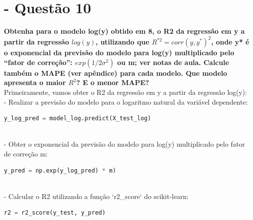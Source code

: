 \documentclass[a4paper, 12pt]{article}
\begin{document}
\section{- Questão 10}
\textbf{Obtenha para o modelo log(y) obtido em 8, o R2 da regressão em y a partir da regressão $log(y)$, utilizando que $R^{*2}= corr(y,y^*)^2$, onde y* é o exponencial da previsão do modelo para log(y) multiplicado pelo “fator de correção”: $exp (1/2\sigma^2)$ ou m; ver notas de aula.
Calcule também o MAPE (ver apêndice) para cada modelo. Que modelo apresenta o maior $R^2$? E o menor MAPE? } \\

Primeiramente, vamos obter o R2 da regressão em y a partir da regressão log(y):\\

- Realizar a previsão do modelo para o logaritmo natural da variável dependente:\\



\begin{tcolorbox}[colback=white,boxrule=1pt,arc=5pt,auto outer arc]
  \begin{lstlisting}[language=Python]
y_log_pred = model_log.predict(X_test_log)

    \end{lstlisting}
\end{tcolorbox} \\


- Obter o exponencial da previsão do modelo para log(y) multiplicado pelo fator de correção m:\\

\begin{tcolorbox}[colback=white,boxrule=1pt,arc=5pt,auto outer arc]
  \begin{lstlisting}[language=Python]
y_pred = np.exp(y_log_pred) * m)

    \end{lstlisting}
\end{tcolorbox} \\

- Calcular o R2 utilizando a função `r2_score` do scikit-learn:\\

\begin{tcolorbox}[colback=white,boxrule=1pt,arc=5pt,auto outer arc]
  \begin{lstlisting}[language=Python]
r2 = r2_score(y_test, y_pred)
    \end{lstlisting}
\end{tcolorbox} \\
\end{document}

